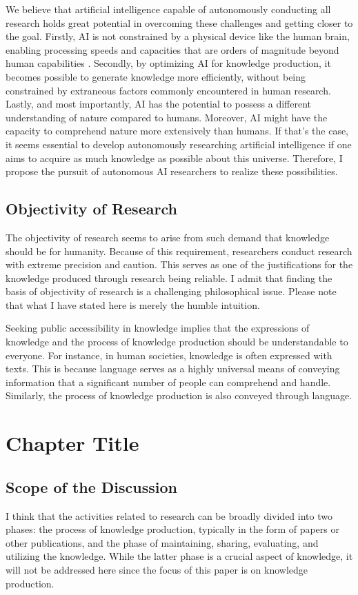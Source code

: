 \documentclass{book}
\begin{document}
We believe that artificial intelligence capable of autonomously conducting all research holds great potential in overcoming these challenges and getting closer to the goal. Firstly, AI is not constrained by a physical device like the human brain, enabling processing speeds and capacities that are orders of magnitude beyond human capabilities \cite{hope2022computational,kitano2021nobel}. Secondly, by optimizing AI for knowledge production, it becomes possible to generate knowledge more efficiently, without being constrained by extraneous factors commonly encountered in human research. Lastly, and most importantly, AI has the potential to possess a different understanding of nature compared to humans. Moreover, AI might have the capacity to comprehend nature more extensively than humans. If that's the case, it seems essential to develop autonomously researching artificial intelligence if one aims to acquire as much knowledge as possible about this universe. Therefore, I propose the pursuit of autonomous AI researchers to realize these possibilities.

\section{Objectivity of Research}

The objectivity of research seems to arise from such demand that knowledge should be for humanity. Because of this requirement, researchers conduct research with extreme precision and caution. This serves as one of the justifications for the knowledge produced through research being reliable. I admit that finding the basis of objectivity of research is a challenging philosophical issue. Please note that what I have stated here is merely the humble intuition.

Seeking public accessibility in knowledge implies that the expressions of knowledge and the process of knowledge production should be understandable to everyone. For instance, in human societies, knowledge is often expressed with texts. This is because language serves as a highly universal means of conveying information that a significant number of people can comprehend and handle. Similarly, the process of knowledge production is also conveyed through language.


\chapter{Chapter Title}
\section{Scope of the Discussion}
I think that the activities related to research can be broadly divided into two phases: the process of knowledge production, typically in the form of papers or other publications, and the phase of maintaining, sharing, evaluating, and utilizing the knowledge. While the latter phase is a crucial aspect of knowledge, it will not be addressed here since the focus of this paper is on knowledge production. 
\end{document}
